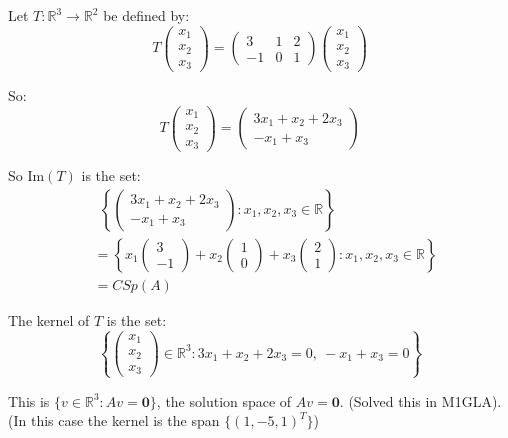 \documentclass[twoside]{scrartcl}
\begin{document}
\begin{example} Let $T : \mathbb{R}^3 \to \mathbb{R}^2$ be defined by:
\[ 
T\begin{pmatrix}
x_1 \\
x_2 \\
x_3 \end{pmatrix}
= 
\begin{pmatrix}
3 & 1& 2\\
-1 & 0 & 1\end{pmatrix}
\begin{pmatrix}
x_1 \\
x_2 \\
x_3 \end{pmatrix}
\] 

So: 
 \[ 
T\begin{pmatrix}
x_1 \\
x_2 \\
x_3 \end{pmatrix} 
= 
\begin{pmatrix}
3x_1 + x_2 + 2x_3\\
-x_1 + x_3\end{pmatrix} 
\] 

So Im$(T)$ is the set:
 \[ 
 \begin{aligned}
&~~ \left\{  \begin{pmatrix}
3x_1 + x_2 + 2x_3\\
-x_1 + x_3\end{pmatrix} 
: x_1, x_2, x_3 \in \mathbb{R}
\right\} \\
&= \left\{
x_1 \begin{pmatrix}3\\-1\end{pmatrix} + 
x_2 \begin{pmatrix}1\\0\end{pmatrix}+
x_3\begin{pmatrix}2\\1\end{pmatrix}
: x_1, x_2, x_3 \in \mathbb{R}
\right\} \\
&= CSp(A)
\end{aligned}
\] \vspace*{5pt}


The kernel of $T$ is the set: 
\[
\left\{
\left(\begin{smallmatrix}x_1\\x_2\\x_3\end{smallmatrix}\right) \in \mathbb{R}^3: 
3x_1 + x_2 + 2x_3 = 0,~ -x_1 + x_3 = 0
\right\}\]

This is $\{v \in \mathbb{R}^3: Av = \mathbf{0}\}$, the solution space of $Av = \mathbf{0}$. (Solved this in M1GLA). (In this case the kernel is the span $\{ (1,-5,1)^T \}$)
\end{example}\vspace*{10pt}
\end{document}
